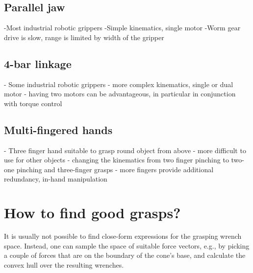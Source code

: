 \subsection{Parallel jaw}
-Most industrial robotic grippers
-Simple kinematics, single motor
-Worm gear drive is slow, range is limited by width of the gripper

\subsection{4-bar linkage}
- Some industrial robotic grippers
- more complex kinematics, single or dual motor
- having two motors can be advantageous, in particular in conjunction with torque control 

\subsection{Multi-fingered hands}
- Three finger hand suitable to grasp round object from above
- more difficult to use for other objects 
- changing the kinematics from two finger pinching to two-one pinching and three-finger grasps
- more fingers provide additional redundancy, in-hand manipulation



\section{How to find good grasps?}

It is usually not possible to find close-form expressions for the grasping wrench space. Instead, one can sample the space of suitable force vectors, e.g., by picking a couple of forces that are on the boundary of the cone's base, and calculate the convex hull over the resulting wrenches.



